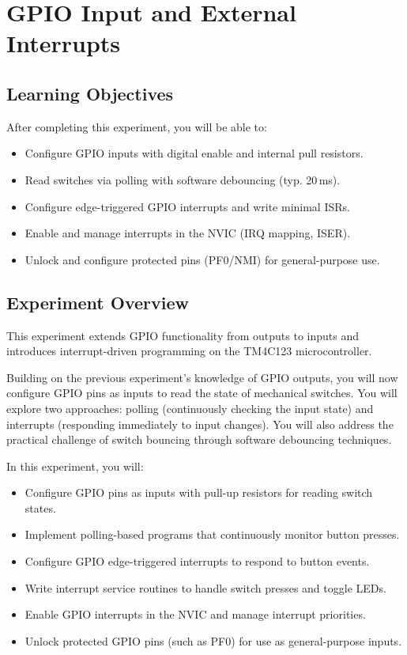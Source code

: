 \chapter{GPIO Input and External Interrupts}

\section*{Learning Objectives}
After completing this experiment, you will be able to:
\begin{itemize}[nosep]
  \item Configure GPIO inputs with digital enable and internal pull resistors.
  \item Read switches via polling with software debouncing (typ. 20\,ms).
  \item Configure edge-triggered GPIO interrupts and write minimal ISRs.
  \item Enable and manage interrupts in the NVIC (IRQ mapping, ISER).
  \item Unlock and configure protected pins (PF0/NMI) for general-purpose use.
\end{itemize}


\section*{Experiment Overview}
This experiment extends GPIO functionality from outputs to inputs and introduces interrupt-driven programming on the TM4C123 microcontroller.

\noindent Building on the previous experiment's knowledge of GPIO outputs, you will now configure GPIO pins as inputs to read the state of mechanical switches. You will explore two approaches: polling (continuously checking the input state) and interrupts (responding immediately to input changes). You will also address the practical challenge of switch bouncing through software debouncing techniques.

\noindent In this experiment, you will:
\begin{itemize}[nosep]
  \item Configure GPIO pins as inputs with pull-up resistors for reading switch states.
  \item Implement polling-based programs that continuously monitor button presses.
  \item Configure GPIO edge-triggered interrupts to respond to button events.
  \item Write interrupt service routines to handle switch presses and toggle LEDs.
  \item Enable GPIO interrupts in the NVIC and manage interrupt priorities.
  \item Unlock protected GPIO pins (such as PF0) for use as general-purpose inputs.
\end{itemize}

